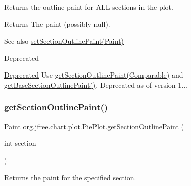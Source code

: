 Returns the outline paint for A\+LL sections in the plot.

\begin{DoxyReturn}{Returns}
The paint (possibly {\ttfamily null}).
\end{DoxyReturn}
\begin{DoxySeeAlso}{See also}
\mbox{\hyperlink{classorg_1_1jfree_1_1chart_1_1plot_1_1_pie_plot_ae573b32fba1d3c66a0e25516f5e6da16}{set\+Section\+Outline\+Paint(\+Paint)}}
\end{DoxySeeAlso}
\begin{DoxyRefDesc}{Deprecated}
\item[\mbox{\hyperlink{deprecated__deprecated000070}{Deprecated}}]Use \mbox{\hyperlink{classorg_1_1jfree_1_1chart_1_1plot_1_1_pie_plot_ad5075d6d33c6dfbaab396a2b4a6b45bf}{get\+Section\+Outline\+Paint(\+Comparable)}} and \mbox{\hyperlink{classorg_1_1jfree_1_1chart_1_1plot_1_1_pie_plot_a09734d6fd44506facb9a597034af3eea}{get\+Base\+Section\+Outline\+Paint()}}. Deprecated as of version 1... \end{DoxyRefDesc}
\mbox{\label{classorg_1_1jfree_1_1chart_1_1plot_1_1_pie_plot_a07b4cfea40dfe0868d23c9e5264b7fc3}} 
\subsubsection{\texorpdfstring{get\+Section\+Outline\+Paint()}{getSectionOutlinePaint()}\hspace{0.1cm}{\footnotesize\ttfamily [3/3]}}
{\footnotesize\ttfamily Paint org.\+jfree.\+chart.\+plot.\+Pie\+Plot.\+get\+Section\+Outline\+Paint (\begin{DoxyParamCaption}\item[{int}]{section }\end{DoxyParamCaption})}

Returns the paint for the specified section.


